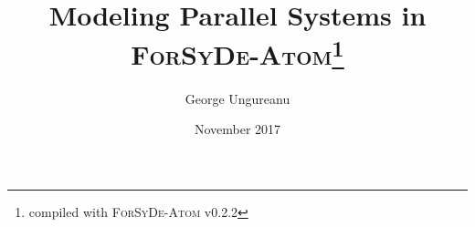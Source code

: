 \documentclass{article}
\title{Modeling Parallel Systems in\\\textsc{ForSyDe-Atom}\thanks{compiled with \textsc{ForSyDe-Atom} v0.2.2}}
\author{George Ungureanu}
\date{November 2017}
\begin{document}
\maketitle

\begin{abstract}

\end{abstract}



\newpage
\tableofcontents
\newpage







\printbibliography
\end{document}
